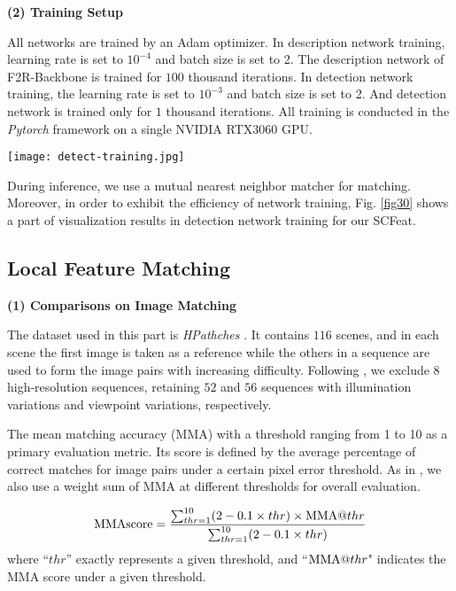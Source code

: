 \documentclass[journal]{IEEEtran}
\begin{document}
\textbf{(2) Training Setup}

All networks are trained by an Adam optimizer. In description network training, learning rate is set to $10^{-4}$ and batch size is set to 2. The description network of F2R-Backbone is trained for $100$ thousand iterations. In detection network training, the learning rate is set to $10^{-3}$ and batch size is set to 2. And detection network is trained only for $1$ thousand iterations. All training is conducted in the \emph{Pytorch} framework on a single NVIDIA RTX3060 GPU. 


\begin{figure*}[h]
\centering
\texttt{[image: detect-training.jpg]}
\caption{Visualization of detection network training for our SCFeat. The maximum interest point number is limited to $2k$ and the maximum iteration is limited to $1000$.}
\label{fig30}
\end{figure*}

During inference, we use a mutual nearest neighbor matcher for matching. Moreover, in order to exhibit the efficiency of network training, Fig. \ref{fig30} shows a part of visualization results in detection network training for our SCFeat.


\subsection{Local Feature Matching}\label{sec-fm}






\textbf{(1) Comparisons on Image Matching}

The dataset used in this part is \emph{HPathches} \cite{HPatches}. It contains $116$ scenes, and in each scene the first image is taken as a reference while the others in a sequence are used to form the image pairs with increasing difficulty. Following \cite{D2net,li2022decoupling}, we exclude 8 high-resolution sequences, retaining $52$ and $56$ sequences with illumination variations and viewpoint variations, respectively.

The mean matching accuracy (MMA) with a threshold ranging from 1 to 10 as a primary evaluation metric. Its score is defined by the average percentage of correct matches for image pairs under a certain pixel error threshold. As in \cite{li2022decoupling}, we also use a weight sum of MMA at different thresholds for overall evaluation.

\begin{equation}\label{eq-mma}
        {\rm MMAscore}  =\frac{\sum_{thr=1}^{10}(2-0.1\times thr)\times {\rm MMA}@thr}{\sum_{thr=1}^{10}(2-0.1\times thr)}
\end{equation}
where ``$thr$'' exactly represents a given threshold, and ``${\rm MMA}@thr$" indicates the MMA score under a given threshold.
\end{document}
